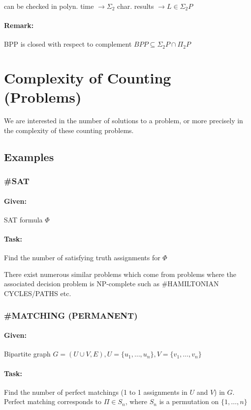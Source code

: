 \documentclass[11pt]{article}
\theoremstyle{definition}
\theoremstyle{definition}
\begin{document}
can be checked in polyn. time $ \rightarrow \Sigma_2$ char. results $ \rightarrow L \in \Sigma_2 P $

\paragraph{Remark:} BPP is closed with respect to complement $ BPP \subseteq \Sigma_2 P \cap \Pi_2 P $

\section{Complexity of Counting (Problems)}

We are interested in the number of solutions to a problem, or more precisely in the complexity of these counting problems.

\subsection{Examples}

\subsubsection{\#SAT}

\paragraph{Given:} SAT formula $ \Phi $
\paragraph{Task:} Find the number of satisfying truth assignments for $ \Phi $

There exist numerous similar problems which come from problems where the associated decision problem is NP-complete such as \#HAMILTONIAN CYCLES/PATHS etc.

\subsubsection{\#MATCHING (PERMANENT)}


\paragraph{Given:} Bipartite graph $ G = (U \cup V, E), U = \{u_1, \dots, u_n\}, V = \{v_1, \dots, v_n\} $

\paragraph{Task:} Find the number of perfect matchings (1 to 1 assignments in $ U $ and $ V $) in $ G $. Perfect matching corresponds to $ \Pi \in S_n $, where $ S_n $ is a permutation on $ \{ 1, \dots, n \} $
\end{document}
